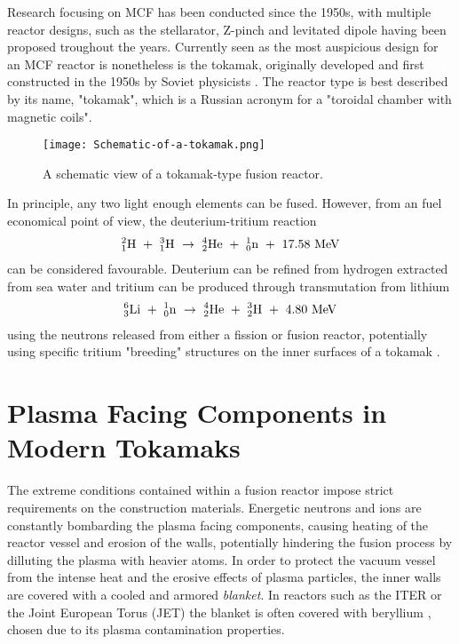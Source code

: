 Research focusing on MCF has been conducted since the 1950s, with multiple reactor designs, such as the stellarator, Z-pinch and levitated dipole having been proposed troughout the years. 
Currently seen as the most auspicious design for an MCF reactor is nonetheless is the tokamak, originally developed and first constructed in the 1950s by Soviet physicists \cite{tokamakorigins}. 
The reactor type is best described by its name, "tokamak", which is a Russian acronym for a "toroidal chamber with magnetic coils".

\begin{figure}[!ht]
\center
\texttt{[image: Schematic-of-a-tokamak.png]}
\caption{A schematic view of a tokamak-type fusion reactor.} 
\label{fig:tokamak}
\end{figure}

In principle, any two light enough elements can be fused. 
However, from an fuel economical point of view, the deuterium-tritium reaction 
\begin{align}
^2_1\rm{H} ~+~ ^3_1\rm{H} ~\rightarrow~ ^4_2\rm{He} ~+~ ^1_0\rm{n} ~+~ 17.58 ~\rm{MeV}
\label{Eq:D-T-reaction}
\end{align}
can be considered favourable. 
Deuterium can be refined from hydrogen extracted from sea water and tritium can be produced through transmutation from lithium
\begin{align}
^6_3\rm{Li} ~+~ ^1_0\rm{n} ~\rightarrow~ ^4_2\rm{He} ~+~ ^3_2\rm{H} ~+~ 4.80  ~\rm{MeV}
\end{align}
using the neutrons released from either a fission or fusion reactor, potentially using specific tritium "breeding" structures on the inner surfaces of a tokamak \cite{giancarli2012overview}.


\section{Plasma Facing Components in Modern Tokamaks}

The extreme conditions contained within a fusion reactor impose strict requirements on the construction materials. 
Energetic neutrons and ions are constantly bombarding the plasma facing components, causing heating of the reactor vessel and erosion of the walls, potentially hindering the fusion process by dilluting the plasma with heavier atoms. 
In order to protect the vacuum vessel from the intense heat and the erosive effects of plasma particles, the inner walls are covered with a cooled and armored \textit{blanket}. 
In reactors such as the ITER or the Joint European Torus (JET) the blanket is often covered with beryllium \cite{raffray2012overview}, chosen due to its plasma contamination properties.

